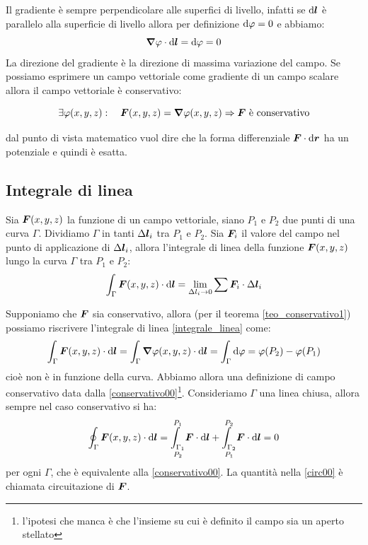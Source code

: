 Il gradiente è sempre perpendicolare alle superfici di livello, infatti se $\mathrm{d}\boldsymbol{l}$ è parallelo alla superficie di livello allora per definizione $\mathrm{d} \varphi=0$ e abbiamo:
\[\boldsymbol{\nabla}\varphi\cdot\mathrm{d} \boldsymbol{l}=\mathrm{d}\varphi=0\]
La direzione del gradiente è la direzione di massima variazione del campo. Se possiamo esprimere un campo vettoriale come gradiente di un campo scalare allora il campo vettoriale è conservativo:
\begin{Teo}
  \label{teo_conservativo1}
  \[\exists \varphi(x,y,z):\quad \boldsymbol{F}(x,y,z)=\boldsymbol{\nabla}\varphi(x,y,z)\Rightarrow\text{$\boldsymbol{F}$ è conservativo}\]
\end{Teo}
dal punto di vista matematico vuol dire che la forma differenziale $\boldsymbol{F}\cdot\mathrm{d}\boldsymbol{r}$ ha un potenziale e quindi è esatta.
\subsection{Integrale di linea}
\begin{Def}
  Sia $\boldsymbol{F}(x,y,z)$ la funzione di un campo vettoriale, siano $P_1$ e $P_2$ due punti di una curva $\Gamma$. Dividiamo $\Gamma$ in tanti $\Delta \boldsymbol{l}_i$ tra $P_1$ e $P_2$. Sia $\boldsymbol{F}_i$ il valore del campo nel punto di applicazione di $\Delta \boldsymbol{l}_i$, allora l'integrale di linea della funzione $\boldsymbol{F}(x,y,z)$ lungo la curva $\Gamma$ tra $P_1$ e $P_2$:
  \begin{equation}
    \label{integrale_linea}
    \int_\Gamma \boldsymbol{F}(x,y,z)\cdot \mathrm{d}\boldsymbol{l}=\lim_{\Delta l_i\to 0}\sum\boldsymbol{F}_i\cdot\Delta\boldsymbol{l}_i
  \end{equation}
\end{Def}
Supponiamo che $\boldsymbol{F}$ sia conservativo, allora (per il teorema \ref{teo_conservativo1}) possiamo riscrivere l'integrale di linea \eqref{integrale_linea} come:
\begin{equation}
  \label{conservativo00}
  \int_\Gamma \boldsymbol{F}(x,y,z)\cdot \mathrm{d} \boldsymbol{l}=\int_\Gamma \boldsymbol{\nabla}\varphi(x,y,z)\cdot\mathrm{d}\boldsymbol{l}=\int_\Gamma \mathrm{d}\varphi=\varphi(P_2)-\varphi(P_1)
\end{equation}
cioè non è in funzione della curva. Abbiamo allora una definizione di campo conservativo data dalla \eqref{conservativo00}\footnote{l'ipotesi che manca è che l'insieme su cui è definito il campo sia un aperto stellato}. Consideriamo $\Gamma$ una linea chiusa, allora sempre nel caso conservativo si ha:
\begin{equation}
  \label{circ00}
  \oint_\Gamma\boldsymbol{F}(x,y,z)\cdot\mathrm{d}\boldsymbol{l}=\underset{P_2}{\overset{P_1}{\int_{\Gamma_1}}}\boldsymbol{F}\cdot\mathrm{d}\boldsymbol{l}+\underset{P_1}{\overset{P_2}{\int_{\Gamma_2}}}\boldsymbol{F}\cdot\mathrm{d}\boldsymbol{l}=0
\end{equation}
per ogni $\Gamma$, che è equivalente alla \eqref{conservativo00}. La quantità nella \eqref{circ00} è chiamata circuitazione di $\boldsymbol{F}$.
